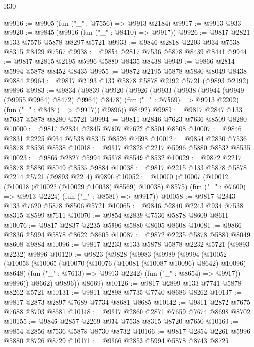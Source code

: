 \begin{lexlean}{R30}
\begin{coremodule}
@9916 := @9905 (fun ("_" : @7556) => @9913 @2184)
@9917 := @9913 @933
@9920 := @9845 (@9916 (fun ("_" : @8410) => @9917))
@9926 := @9817 @2821 @133 @7576 @5878 @8297 @5721
@9933 := @9846 @2818 @2203 @934 @7538 @8315 @8429 @7567
@9938 := @9854 @2817 @7536 @5878 @8439 @8441
@9944 := @9817 @2815 @2195 @5996 @5880 @8435 @8438
@9949 := @9866 @2814 @5994 @5878 @8452 @8435
@9955 := @9872 @2195 @5878 @5880 @8049 @8438 @9884
@9964 := @9817 @2193 @133 @5878 @5878 @2192 @5721 (@9893 @2192) @9896
@9983 := @9834
    (@9839
      (@9920
        (@9926
          (@9933
            (@9938 (@9944 (@9949 (@9955 @9964) @8472) @9964) @8478)
            (fun ("_" : @7569) => @9913 @2202)
            (fun ("_" : @8484) => @9917))
          @9896))
      @8492)
@9989 := @9817 @2847 @133 @7637 @5878 @8280 @5721
@9994 := @9811 @2846 @7623 @7636 @8509 @8280
@10000 := @9817 @2834 @2845 @7607 @7622 @8504 @8508
@10007 := @9846 @2831 @2225 @934 @7538 @8315 @8526 @7598
@10012 := @9854 @2830 @7536 @5878 @8536 @8538
@10018 := @9817 @2828 @2217 @5996 @5880 @8532 @8535
@10023 := @9866 @2827 @5994 @5878 @8549 @8532
@10029 := @9872 @2217 @5878 @5880 @8049 @8535 @9884
@10038 := @9817 @2215 @133 @5878 @5878 @2214 @5721 (@9893 @2214) @9896
@10052 := @10000
    (@10007
      (@10012 (@10018 (@10023 (@10029 @10038) @8569) @10038) @8575)
      (fun ("_" : @7600) => @9913 @2224)
      (fun ("_" : @8581) => @9917))
@10058 := @9817 @2843 @133 @7620 @5878 @8506 @5721
@10065 := @9846 @2840 @2243 @934 @7538 @8315 @8599 @7611
@10070 := @9854 @2839 @7536 @5878 @8609 @8611
@10076 := @9817 @2837 @2235 @5996 @5880 @8605 @8608
@10081 := @9866 @2836 @5994 @5878 @8622 @8605
@10087 := @9872 @2235 @5878 @5880 @8049 @8608 @9884
@10096 := @9817 @2233 @133 @5878 @5878 @2232 @5721 (@9893 @2232) @9896
@10120 := @9823
    (@9828
      (@9983
        (@9989
          (@9994
            (@10052
              (@10058
                (@10065
                  (@10070 (@10076 (@10081 (@10087 @10096) @8642) @10096) @8648)
                  (fun ("_" : @7613) => @9913 @2242)
                  (fun ("_" : @8654) => @9917))
                @9896))
            @8662)
          @9896))
      @8669)
@10126 := @9817 @2899 @133 @7741 @5878 @8262 @5721
@10131 := @9811 @2898 @7735 @7740 @8686 @8262
@10137 := @9817 @2873 @2897 @7689 @7734 @8681 @8685
@10142 := @9811 @2872 @7675 @7688 @8703 @8681
@10148 := @9817 @2860 @2871 @7659 @7674 @8698 @8702
@10155 := @9846 @2857 @2269 @934 @7538 @8315 @8720 @7650
@10160 := @9854 @2856 @7536 @5878 @8730 @8732
@10166 := @9817 @2854 @2261 @5996 @5880 @8726 @8729
@10171 := @9866 @2853 @5994 @5878 @8743 @8726

\end{coremodule}
\end{lexlean}
